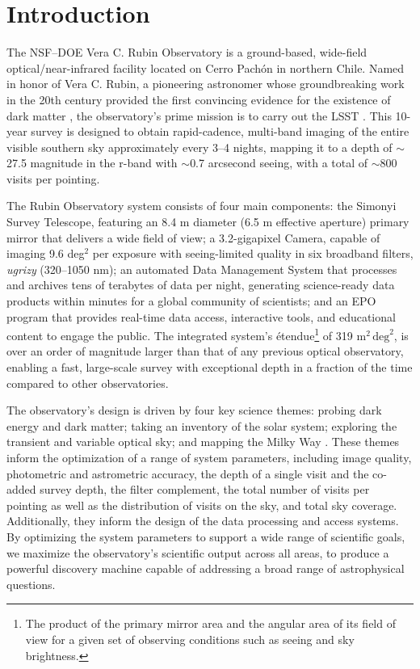 \section{Introduction
\label{sec:intro}}
The \gls{NSF}–\gls{DOE} Vera C. Rubin Observatory is a ground-based, wide-field optical/near-infrared facility located on Cerro Pach\'on in northern Chile.
Named in honor of Vera C. Rubin, a pioneering astronomer whose groundbreaking work in the 20th century provided the first convincing evidence for the existence of dark matter \citep{1970ApJ...159..379R, 1980ApJ...238..471R}, the observatory’s prime mission is to carry out the \gls{LSST} \citep{2019ApJ...873..111I}.
This 10-year survey is designed to obtain rapid-\gls{cadence}, multi-band imaging of the entire visible southern sky approximately every 3–4 nights, mapping it to a depth of $\sim$ 27.5 magnitude in the r-band with $\sim$0.7 arcsecond \gls{seeing}, with a total of $\sim$800 visits per pointing.

The Rubin Observatory system consists of four main components: the \gls{Simonyi Survey Telescope}, featuring an 8.4 m diameter (6.5 m effective aperture) primary mirror that delivers a wide field of view; a 3.2-gigapixel Camera, capable of imaging 9.6 deg$^2$ per exposure with seeing-limited quality in six broadband filters, \textit{ugrizy} (320–1050 nm); an automated \gls{Data Management System} that processes and archives tens of terabytes of data per night, generating science-ready data products within minutes for a global community of scientists; and an \gls{EPO} program that provides real-time data access, interactive tools, and educational content to engage the public.
The integrated system's \'etendue\footnote{The product of the primary mirror area and the angular area of its field of view for a given set of observing conditions such as seeing and sky brightness.} of 319 $\text{m}^2 \,\text{deg}^2$, is over an order of magnitude larger than that of any  previous optical observatory, enabling a fast, large-scale survey with exceptional depth in a fraction of the time compared to other observatories.

The observatory's design is driven by four key science themes: probing dark energy and dark matter; taking an inventory of the solar system; exploring the transient and variable optical sky; and mapping the Milky Way \citep{2019ApJ...873..111I}.
These themes inform the optimization of a range of system parameters, including image quality, photometric and astrometric accuracy, the depth of a single visit and the co-added survey depth, the filter complement, the total number of visits per pointing as well as the distribution of visits on the sky, and  total sky coverage.
Additionally, they inform the design of the data processing and access systems.
By optimizing the system parameters to support a wide range of scientific goals, we maximize the observatory's scientific output across all areas, to produce a powerful discovery machine capable of addressing a broad range of astrophysical questions.

